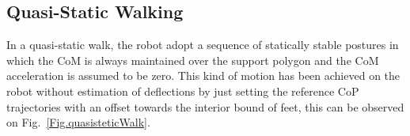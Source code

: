 \documentclass[letterpaper, 10 pt, conference]{ieeeconf}  %
\begin{document}






\subsection{Quasi-Static Walking}
    In a quasi-static walk, the robot adopt a sequence of statically stable postures in which the CoM is always maintained over the support polygon and the CoM acceleration is assumed to be zero. This kind of motion has been achieved on the robot without estimation of deflections by just setting the reference CoP trajectories with an offset towards the interior bound of feet, this can be observed on Fig.~\ref{Fig.quasisteticWalk}. 
    
\end{document}
